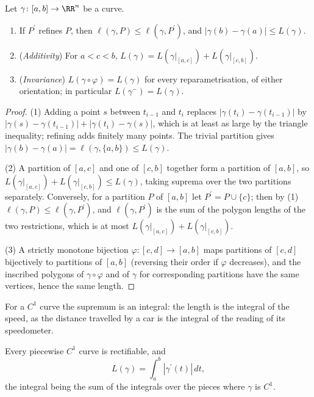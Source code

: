 \begin{lemma}\label{real-analysis:lemma-length-basic}
Let $\gamma \colon [a, b] \to \RR^n$ be a curve.
\begin{enumerate}
\item If $P^{\prime}$ refines $P$, then $\ell(\gamma, P) \leq \ell(\gamma, P^{\prime})$, and $|\gamma(b) - \gamma(a)| \leq L(\gamma)$.
\item (\emph{Additivity}) For $a < c < b$, $L(\gamma) = L(\gamma|_{[a, c]}) + L(\gamma|_{[c, b]})$.
\item (\emph{Invariance}) $L(\gamma \circ \varphi) = L(\gamma)$ for every reparametrisation, of either orientation; in particular $L(\gamma^-) = L(\gamma)$.
\end{enumerate}
\end{lemma}

\begin{proof}
(1) Adding a point $s$ between $t_{i-1}$ and $t_i$ replaces $|\gamma(t_i) - \gamma(t_{i-1})|$ by $|\gamma(s) - \gamma(t_{i-1})| + |\gamma(t_i) - \gamma(s)|$, which is at least as large by the triangle inequality;
refining adds finitely many points. The trivial partition gives $|\gamma(b) - \gamma(a)| = \ell(\gamma, \{a, b\}) \leq L(\gamma)$.

(2) A partition of $[a, c]$ and one of $[c, b]$ together form a partition of $[a, b]$, so $L(\gamma|_{[a, c]}) + L(\gamma|_{[c, b]}) \leq L(\gamma)$, taking suprema over the two partitions separately.
Conversely, for a partition $P$ of $[a, b]$ let $P^{\prime} = P \cup \{c\}$; then by (1) $\ell(\gamma, P) \leq \ell(\gamma, P^{\prime})$, and $\ell(\gamma, P^{\prime})$ is the sum of the polygon lengths of the two restrictions,
which is at most $L(\gamma|_{[a, c]}) + L(\gamma|_{[c, b]})$.

(3) A strictly monotone bijection $\varphi \colon [c, d] \to [a, b]$ maps partitions of $[c, d]$ bijectively to partitions of $[a, b]$ (reversing their order if $\varphi$ decreases), and the inscribed polygons of
$\gamma \circ \varphi$ and of $\gamma$ for corresponding partitions have the same vertices, hence the same length.
\end{proof}

For a $C^1$ curve the supremum is an integral: the length is the integral of the speed, as the distance travelled by a car is the integral of the reading of its speedometer.

\begin{theorem}\label{real-analysis:theorem-length-integral}
Every piecewise $C^1$ curve is rectifiable, and
\[
L(\gamma) = \int_a^b|\gamma^{\prime}(t)|\,dt,
\]
the integral being the sum of the integrals over the pieces where $\gamma$ is $C^1$.
\end{theorem}

